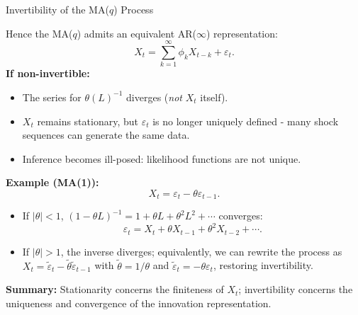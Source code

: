 \documentclass{beamer}
\begin{document}
\begin{frame}{Invertibility of the MA($q$) Process}
\footnotesize

Hence the MA($q$) admits an equivalent AR($\infty$) representation:
\[
X_t = \sum_{k=1}^{\infty} \phi_k X_{t-k} + \varepsilon_t.
\]
\pause
\textbf{If non-invertible:}
\begin{itemize}
    \item The series for $\theta(L)^{-1}$ diverges (\emph{not} $X_t$ itself).  
    \item $X_t$ remains stationary, but $\varepsilon_t$ is no longer uniquely defined - many shock sequences can generate the same data.
    \item Inference becomes ill-posed: likelihood functions are not unique.
\end{itemize}

\pause
\textbf{Example (MA(1)):}
\[
X_t = \varepsilon_t - \theta \varepsilon_{t-1}.
\]
\begin{itemize}
    \item If $|\theta|<1$, \; $(1-\theta L)^{-1}=1+\theta L+\theta^2 L^2+\cdots$ converges:
    \[
        \varepsilon_t = X_t + \theta X_{t-1} + \theta^2 X_{t-2} + \cdots.
    \]
    \item If $|\theta|>1$, the inverse diverges;  
          equivalently, we can rewrite the process as
          \( X_t = \tilde{\varepsilon}_t - \tilde{\theta}\tilde{\varepsilon}_{t-1} \)
          with \( \tilde{\theta}=1/\theta \) and \( \tilde{\varepsilon}_t=-\theta\varepsilon_t \),
          restoring invertibility.
\end{itemize}

\textbf{Summary:}  
Stationarity concerns the finiteness of $X_t$; invertibility concerns the uniqueness and convergence of the innovation representation.

\end{frame}




\end{document}
